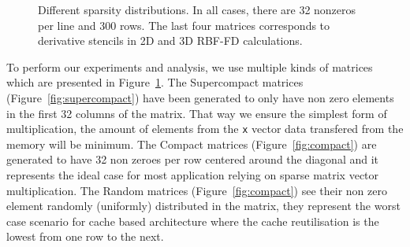 \documentclass[10pt,conference,compsocconf]{IEEEtran}
\begin{document}
\begin{figure}
\begin{center}
  \end{center}
  
  \caption{Different sparsity distributions. In all cases, there are
    32 nonzeros per line and 300 rows. The last four matrices
    corresponds to derivative stencils in 2D and 3D RBF-FD
    calculations.}
  \label{fig:spy_plots}
\end{figure}

To perform our experiments and analysis, we use multiple kinds of
matrices which are presented in Figure~\ref{fig:spy_plots}. The
Supercompact matrices (Figure~\ref{fig:supercompact}) have been
generated to only have non zero elements in the first 32 columns of
the matrix. That way we ensure the simplest form of multiplication,
the amount of elements from the {\tt x} vector data transfered from
the memory will be minimum. The Compact matrices
(Figure~\ref{fig:compact}) are generated to have 32 non zeroes per row
centered around the diagonal and it represents the ideal case for most
application relying on sparse matrix vector multiplication. The Random
matrices (Figure~\ref{fig:compact}) see their non zero element
randomly (uniformly) distributed in the matrix, they represent the
worst case scenario for cache based architecture where the cache
reutilisation is the lowest from one row to the next.
\end{document}
